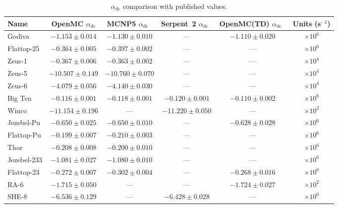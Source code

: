 \documentclass[12pt,preprint]{elsarticle}
\begin{document}
\begin{table}[H]
\centering
\caption{$\alpha_{\mathrm{dc}}$ comparison with published values.}
\label{tab:literature}
\footnotesize
\begin{tabular}{@{}lccccc@{}}
\toprule
Name & OpenMC $\alpha_{\mathrm{dc}}$ & MCNP5 $\alpha_{\mathrm{dc}}$~\cite{mosteller2011} & Serpent~2 $\alpha_{\mathrm{dc}}$~\cite{leppanen2014} & OpenMC(TD) $\alpha_{\mathrm{dc}}$~\cite{romero2022} & Units (s$^{-1}$) \\
\midrule
Godiva       & $-1.153 \pm 0.014$ & $-1.130 \pm 0.010$ & ---                 & $-1.110 \pm 0.020$ & $\times 10^6$ \\
Flattop-25   & $-0.364 \pm 0.005$ & $-0.397 \pm 0.002$ & ---                 & ---                & $\times 10^6$ \\
Zeus-1       & $-0.367 \pm 0.006$ & $-0.363 \pm 0.002$ & ---                 & ---                & $\times 10^4$ \\
Zeus-5       & $-10.507 \pm 0.149$  & $-10.760 \pm 0.070$  & ---                 & ---                & $\times 10^4$ \\
Zeus-6       & $-4.079 \pm 0.056$ & $-4.140 \pm 0.030$ & ---                 & ---                & $\times 10^4$ \\
Big Ten      & $-0.116 \pm 0.001$ & $-0.118 \pm 0.001$ & $-0.120 \pm 0.001$  & $-0.110 \pm 0.002$ & $\times 10^6$ \\
Winco        & $-11.154 \pm 0.196$ & ---                & $-11.220 \pm 0.050$   & ---                & $\times 10^2$ \\
Jezebel-Pu   & $-0.650 \pm 0.025$ & $-0.650 \pm 0.010$ & ---                 & $-0.628 \pm 0.028$ & $\times 10^6$ \\
Flattop-Pu   & $-0.199 \pm 0.007$ & $-0.210 \pm 0.003$ & ---                 & ---                & $\times 10^6$ \\
Thor         & $-0.208 \pm 0.008$ & $-0.200 \pm 0.010$ & ---                 & ---                & $\times 10^6$ \\
Jezebel-233  & $-1.081 \pm 0.027$ & $-1.080 \pm 0.010$ & ---                 & ---                & $\times 10^6$ \\
Flattop-23   & $-0.272 \pm 0.007$ & $-0.302 \pm 0.004$ & ---                 & $-0.268 \pm 0.016$ & $\times 10^6$ \\
RA-6         & $-1.715 \pm 0.050$ & ---                 & ---                 & $-1.724 \pm 0.027$ & $\times 10^2$ \\
SHE-8        & $-6.536 \pm 0.129$ & ---                 & $-6.428 \pm 0.028$  & ---                & $\times 10^0$ \\

\end{tabular}
\end{table}
\end{document}
